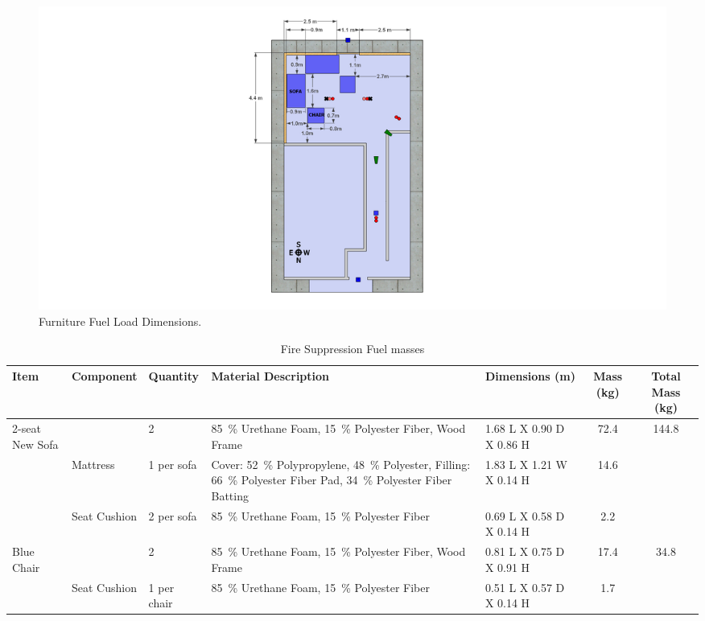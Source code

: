 \documentclass[12pt,oneside]{book}
\begin{document}
\begin{figure}[!ht]
	\includegraphics[width=.8\columnwidth]{../Figures/Pictures/DelCoSingleStoryFurnitureFuelLoad}
	\caption{Furniture Fuel Load Dimensions.}
	\label{fig:Furniture_Fuel_Load_Dimensions}
\end{figure}

\begin{table}
	\centering
	\scriptsize
	\caption{Fire Suppression Fuel masses}
	\renewcommand{\tabcolsep}{1pt}
	\begin{tabular}{lllllcc}
		\toprule[1.5pt]
		Item               & Component		& Quantity		&  Material Description             							&  Dimensions (m)            	&  Mass (kg)  		& Total Mass (kg) \\
		\midrule
		2-seat New Sofa    &				& 2				& 85~\% Urethane Foam, 15~\% Polyester Fiber, Wood Frame 	   &  1.68 L X 0.90 D X 0.86 H  	&  72.4    			& 144.8 \\
		           	 	   & \multirow{2}{*}{{Mattress}}	    & \multirow{2}{*}{{1 per sofa}}	& \multirow{2}{*}{\parbox{5cm} {Cover: 52~\% Polypropylene, 48~\% Polyester, Filling: 66~\% Polyester Fiber Pad, 34~\% Polyester Fiber  Batting}} & \multirow{2}{*}{{1.83 L X 1.21 W X 0.14 H}}  & \multirow{2}{*}{{14.6}}     \\
		           	 	   &	            &               &                                                          		&                            	&             		& \\[.25cm]
			           	   & Seat Cushion	& 2 per sofa	& 85~\% Urethane Foam, 15~\% Polyester Fiber   				    &  0.69 L X 0.58 D X 0.14 H  	&  2.2     			& \\
		Blue Chair         &				& 2				& 85~\% Urethane Foam, 15~\% Polyester Fiber, Wood Frame   	    &  0.81 L X 0.75 D X 0.91 H  	&  17.4    			& 34.8 \\
		    			   & Seat Cushion   & 1 per chair   & 85~\% Urethane Foam, 15~\% Polyester Fiber					&  0.51 L X 0.57 D X 0.14 H  	&  1.7    			& \\

\end{tabular}
\end{table}
\end{document}
